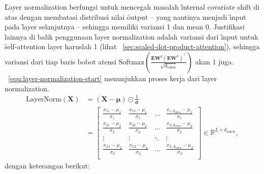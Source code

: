 	\f{Layer normalization} berfungsi untuk mencegah masalah \f{internal covariate shift} di atas dengan membatasi distribusi nilai \f{output} -- yang nantinya menjadi \f{input} pada \f{layer} selanjutnya -- sehingga memiliki variansi 1 dan mean 0. Justifikasi lainnya di balik penggunaan \f{layer normalization} adalah variansi dari \f{input} untuk \f{self-attention layer} haruslah 1 (lihat \sect~\ref{sec:scaled-dot-product-attention}), sehingga variansi dari tiap baris bobot atensi $\text{Softmax}(\frac{\mathbf{EW}^q (\mathbf{EW}^k)^{\top}}{\sqrt{d_{\text{token}}}})$ akan 1 juga. \equ~\ref{equ:layer-normalization-start} menunjukkan proses kerja dari \f{layer normalization}.
	\begin{align}
		\label{equ:layer-normalization-start}
		\nonumber \text{LayerNorm}(\mathbf{X}) &= (\mathbf{X}-\bm{\mu})\odot \frac{1}{\bm{\sigma}}\\
		&= \begin{bmatrix}
			\frac{x_{11}-\mu_1}{\sigma_1} & \frac{x_{12}-\mu_1}{\sigma_1} & \dots & \frac{x_{1,d_{\text{token}}}-\mu_1}{\sigma_1} \\
			\frac{x_{21}-\mu_2}{\sigma_2} & \frac{x_{22}-\mu_2}{\sigma_2} & \dots & \frac{x_{2,d_{\text{token}}}-\mu_2}{\sigma_2} \\
			\vdots & \vdots & \ddots & \vdots \\
			\frac{x_{L1}-\mu_L}{\sigma_L} & \frac{x_{L2}-\mu_L}{\sigma_L} & \dots & \frac{x_{L,d_{\text{token}}}-\mu_L}{\sigma_L} \\
		\end{bmatrix} \in \mathbb{R}^{L \times d_{\text{token}}}, 
	\end{align}
	dengan keterangan berikut:
